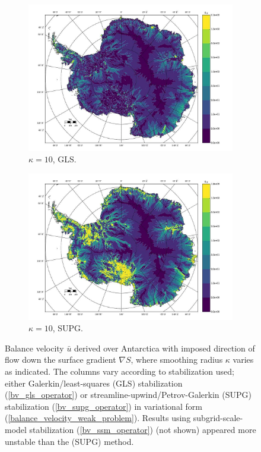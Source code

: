 \begin{figure}
  \begin{subfigure}[b]{0.45\linewidth}
    \includegraphics[width=\linewidth]{images/balance_velocity/antarctica/Ubar_10H_kappa_10_GLS.jpg}
  \caption{$\kappa = 10$, GLS.}
  \label{antarctica_bv_image_kappa_10_GLS}
  \end{subfigure}
  \begin{subfigure}[b]{0.45\linewidth}
    \includegraphics[width=\linewidth]{images/balance_velocity/antarctica/Ubar_10H_kappa_10_SUPG.jpg}
  \caption{$\kappa = 10$, SUPG.}
  \label{antarctica_bv_image_kappa_10_SUPG}
  \end{subfigure}
  
  \caption[Antarctica balance-velocity with $\mathbf{d}^{\text{data}} = -\nabla S$.]{Balance velocity $\bar{u}$ derived over Antarctica with imposed direction of flow down the surface gradient $\nabla S$, where smoothing radius $\kappa$ varies as indicated.  The columns vary according to stabilization used; either Galerkin/least-squares (GLS) stabilization (\ref{bv_gls_operator}) or streamline-upwind/Petrov-Galerkin (SUPG) stabilization (\ref{bv_supg_operator}) in variational form (\ref{balance_velocity_weak_problem}).  Results using subgrid-scale-model stabilization (\ref{bv_ssm_operator}) (not shown) appeared more unstable than the (SUPG) method. \newline \newline}


\end{figure}
